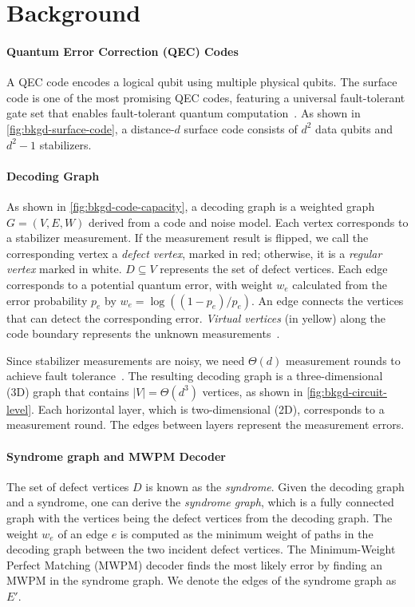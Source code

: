 \section{Background}\label{sec:background}

\paragraph{Quantum Error Correction (QEC) Codes}
A QEC code encodes a logical qubit using multiple physical qubits.
The surface code is one of the most promising QEC codes, featuring a universal fault-tolerant gate set that enables fault-tolerant quantum computation~\cite{fowler2012surface}.
As shown in \autoref{fig:bkgd-surface-code}, a distance-$d$ surface code consists of $d^2$ data qubits and $d^2 - 1$ stabilizers.

\paragraph{Decoding Graph}

As shown in \autoref{fig:bkgd-code-capacity}, a decoding graph is a weighted graph $G = (V, E, W)$ derived from a code and noise model.
Each vertex corresponds to a stabilizer measurement.
If the measurement result is flipped, we call the corresponding vertex a \textit{defect vertex}, marked in red; otherwise, it is a \textit{regular vertex} marked in white.
$D \subseteq V$ represents the set of defect vertices.
Each edge corresponds to a potential quantum error, with weight $w_e$ calculated from the error probability $p_e$ by $w_e = \log ((1 - p_e) / p_e)$.
An edge connects the vertices that can detect the corresponding error.
\textit{Virtual vertices} (in yellow) along the code boundary represents the unknown measurements~\cite{wu2023qce}.

Since stabilizer measurements are noisy, we need $\Theta(d)$ measurement rounds to achieve fault tolerance~\cite{gottesman2013fault}.
The resulting decoding graph is a three-dimensional (3D) graph that contains $|V| = \Theta(d^3)$ vertices, as shown in \autoref{fig:bkgd-circuit-level}.
Each horizontal layer, which is two-dimensional (2D), corresponds to a measurement round.
The edges between layers represent the measurement errors.

\paragraph{Syndrome graph and MWPM Decoder}
The set of defect vertices $D$ is known as the \emph{syndrome}.
Given the decoding graph and a syndrome, one can derive the \emph{syndrome graph}, which is a fully connected graph with the vertices being the defect vertices from the decoding graph.
The weight $w_e$ of an edge $e$ is computed as the minimum weight of paths in the decoding graph between the two incident defect vertices.
The Minimum-Weight Perfect Matching (MWPM) decoder finds the most likely error by finding an MWPM in the syndrome graph.
We denote the edges of the syndrome graph as $E'$.

